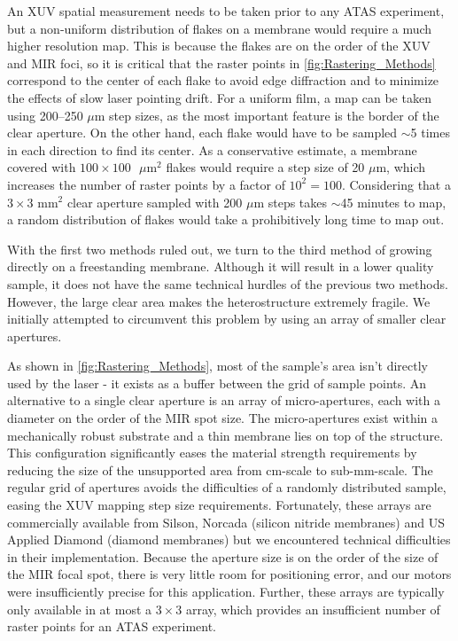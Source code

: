 An XUV spatial measurement needs to be taken prior to any ATAS experiment, but a non-uniform distribution of flakes on a membrane would require a much higher resolution map. This is because the flakes are on the order of the XUV and MIR foci, so it is critical that the raster points in \cref{fig:Rastering_Methods} correspond to the center of each flake to avoid edge diffraction and to minimize the effects of slow laser pointing drift. For a uniform film, a map can be taken using 200--250 $\mu$m step sizes, as the most important feature is the border of the clear aperture. On the other hand, each flake would have to be sampled $\sim$5 times in each direction to find its center. As a conservative estimate, a membrane covered with $100 \times 100\text{ }\mu$m$^2$ flakes would require a step size of 20 $\mu$m, which increases the number of raster points by a factor of $10^2 = 100$. Considering that a $3 \times 3 \text{ mm}^2$ clear aperture sampled with 200 $\mu$m steps takes $\sim$45 minutes to map, a random distribution of flakes would take a prohibitively long time to map out.

With the first two methods ruled out, we turn to the third method of growing directly on a freestanding membrane. Although it will result in a lower quality sample, it does not have the same technical hurdles of the previous two methods. However, the large clear area makes the heterostructure extremely fragile. We initially attempted to circumvent this problem by using an array of smaller clear apertures.

As shown in \cref{fig:Rastering_Methods}, most of the sample's area isn't directly used by the laser - it exists as a buffer between the grid of sample points. An alternative to a single clear aperture is an array of micro-apertures, each with a diameter on the order of the MIR spot size. The micro-apertures exist within a mechanically robust substrate and a thin membrane lies on top of the structure. This configuration significantly eases the material strength requirements by reducing the size of the unsupported area from cm-scale to sub-mm-scale. The regular grid of apertures avoids the difficulties of a randomly distributed sample, easing the XUV mapping step size requirements. Fortunately, these arrays are commercially available from Silson, Norcada (silicon nitride membranes) and US Applied Diamond (diamond membranes) but we encountered technical difficulties in their implementation. Because the aperture size is on the order of the size of the MIR focal spot, there is very little room for positioning error, and our motors were insufficiently precise for this application. Further, these arrays are typically only available in at most a $3\times3$ array, which provides an insufficient number of raster points for an ATAS experiment.

